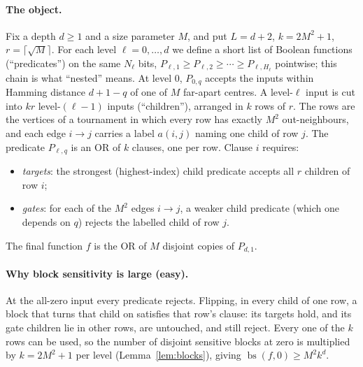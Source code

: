 \documentclass[11pt]{article}
\newcommand{\bs}{\operatorname{bs}}
\theoremstyle{definition}
\theoremstyle{remark}
\begin{document}
\paragraph{The object.}
Fix a depth \(d\ge1\) and a size parameter \(M\), and put \(L=d+2\),
\(k=2M^2+1\), \(r=\lceil\sqrt M\rceil\). For each level
\(\ell=0,\ldots,d\) we define a short list of Boolean functions
(``predicates'') on the same \(N_\ell\) bits,
\(P_{\ell,1}\ge P_{\ell,2}\ge\cdots\ge P_{\ell,H_\ell}\) pointwise; this chain
is what ``nested'' means. At level \(0\), \(P_{0,q}\) accepts the inputs
within Hamming distance \(d+1-q\) of one of \(M\) far-apart centres. A
level-\(\ell\) input is cut into \(kr\) level-\((\ell-1)\) inputs
(``children''), arranged in \(k\) rows of \(r\). The rows are the vertices of
a tournament in which every row has exactly \(M^2\) out-neighbours, and each
edge \(i\to j\) carries a label \(a(i,j)\) naming one child of row \(j\).
The predicate \(P_{\ell,q}\) is an OR of \(k\) clauses, one per row.
Clause \(i\) requires:
\begin{itemize}[nosep]
\item \emph{targets}: the strongest (highest-index) child predicate accepts
 all \(r\) children of row \(i\);
\item \emph{gates}: for each of the \(M^2\) edges \(i\to j\), a weaker child
 predicate (which one depends on \(q\)) rejects the labelled child of row
 \(j\).
\end{itemize}
The final function \(f\) is the OR of \(M\) disjoint copies of \(P_{d,1}\).

\paragraph{Why block sensitivity is large (easy).}
At the all-zero input every predicate rejects. Flipping, in every child of
one row, a block that turns that child on satisfies that row's clause: its
targets hold, and its gate children lie in other rows, are untouched, and
still reject. Every one of the \(k\) rows can be used, so the number of
disjoint sensitive blocks at zero is multiplied by \(k=2M^2+1\) per level
(Lemma~\ref{lem:blocks}), giving \(\bs(f,0)\ge M^2k^d\).
\end{document}
